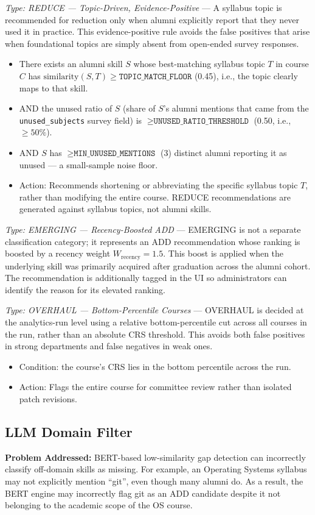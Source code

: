 \textit{Type: REDUCE --- Topic-Driven, Evidence-Positive} --- A syllabus topic is recommended for reduction only when alumni explicitly report that they never used it in practice. This evidence-positive rule avoids the false positives that arise when foundational topics are simply absent from open-ended survey responses.
\begin{itemize}
    \item There exists an alumni skill $S$ whose best-matching syllabus topic $T$ in course $C$ has $\text{similarity}(S, T) \geq \texttt{TOPIC\_MATCH\_FLOOR}$ (0.45), i.e., the topic clearly maps to that skill.
    \item AND the unused ratio of $S$ (share of $S$'s alumni mentions that came from the \texttt{unused\_subjects} survey field) is $\geq \texttt{UNUSED\_RATIO\_THRESHOLD}$ (0.50, i.e., $\geq 50\%$).
    \item AND $S$ has $\geq \texttt{MIN\_UNUSED\_MENTIONS}$ (3) distinct alumni reporting it as unused --- a small-sample noise floor.
    \item Action: Recommends shortening or abbreviating the specific syllabus topic $T$, rather than modifying the entire course. REDUCE recommendations are generated against syllabus topics, not alumni skills.
\end{itemize}

\textit{Type: EMERGING --- Recency-Boosted ADD} --- EMERGING is not a separate classification category; it represents an ADD recommendation whose ranking is boosted by a recency weight $W_{\text{recency}} = 1.5$. This boost is applied when the underlying skill was primarily acquired after graduation across the alumni cohort. The recommendation is additionally tagged in the UI so administrators can identify the reason for its elevated ranking.

\textit{Type: OVERHAUL --- Bottom-Percentile Courses} --- OVERHAUL is decided at the analytics-run level using a relative bottom-percentile cut across all courses in the run, rather than an absolute CRS threshold. This avoids both false positives in strong departments and false negatives in weak ones.
\begin{itemize}
    \item Condition: the course's CRS lies in the bottom percentile across the run.
    \item Action: Flags the entire course for committee review rather than isolated patch revisions.
\end{itemize}

\subsection{LLM Domain Filter}
\textbf{Problem Addressed:} BERT-based low-similarity gap detection can incorrectly classify off-domain skills as missing. For example, an Operating Systems syllabus may not explicitly mention ``git'', even though many alumni do. As a result, the BERT engine may incorrectly flag git as an ADD candidate despite it not belonging to the academic scope of the OS course.

